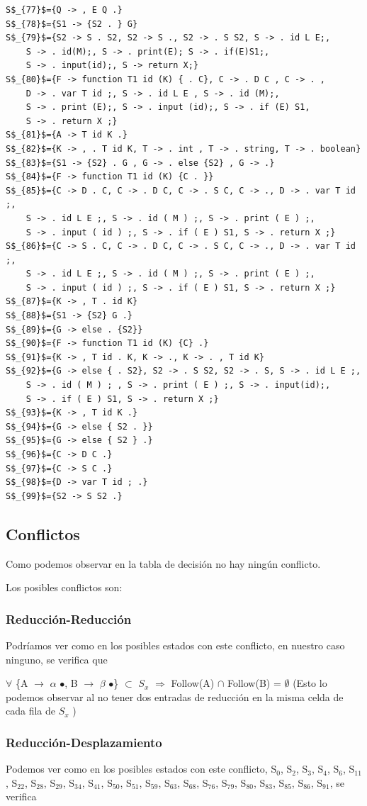 \begin{lstlisting}[style =EstadosAutomataST]
S$_{77}$={Q -> , E Q .}
S$_{78}$={S1 -> {S2 . } G}
S$_{79}$={S2 -> S . S2, S2 -> S ., S2 -> . S S2, S -> . id L E;,
	S -> . id(M);, S -> . print(E); S -> . if(E)S1;,
	S -> . input(id);, S -> return X;}
S$_{80}$={F -> function T1 id (K) { . C}, C -> . D C , C -> . ,
	D -> . var T id ;, S -> . id L E , S -> . id (M);,
	S -> . print (E);, S -> . input (id);, S -> . if (E) S1,
	S -> . return X ;}
S$_{81}$={A -> T id K .}
S$_{82}$={K -> , . T id K, T -> . int , T -> . string, T -> . boolean}
S$_{83}$={S1 -> {S2} . G , G -> . else {S2} , G -> .}
S$_{84}$={F -> function T1 id (K) {C . }}
S$_{85}$={C -> D . C, C -> . D C, C -> . S C, C -> ., D -> . var T id ;,
	S -> . id L E ;, S -> . id ( M ) ;, S -> . print ( E ) ;,
	S -> . input ( id ) ;, S -> . if ( E ) S1, S -> . return X ;}
S$_{86}$={C -> S . C, C -> . D C, C -> . S C, C -> ., D -> . var T id ;,
	S -> . id L E ;, S -> . id ( M ) ;, S -> . print ( E ) ;,
	S -> . input ( id ) ;, S -> . if ( E ) S1, S -> . return X ;}
S$_{87}$={K -> , T . id K}
S$_{88}$={S1 -> {S2} G .}
S$_{89}$={G -> else . {S2}}
S$_{90}$={F -> function T1 id (K) {C} .}
S$_{91}$={K -> , T id . K, K -> ., K -> . , T id K}
S$_{92}$={G -> else { . S2}, S2 -> . S S2, S2 -> . S, S -> . id L E ;,
	S -> . id ( M ) ; , S -> . print ( E ) ;, S -> . input(id);,
	S -> . if ( E ) S1, S -> . return X ;}
S$_{93}$={K -> , T id K .}  
S$_{94}$={G -> else { S2 . }}
S$_{95}$={G -> else { S2 } .}
S$_{96}$={C -> D C .}
S$_{97}$={C -> S C .}
S$_{98}$={D -> var T id ; .}
S$_{99}$={S2 -> S S2 .}
\end{lstlisting}

\subsection{Conflictos}
Como podemos observar en la tabla de decisión no hay ningún conflicto.

Los posibles conflictos son:
	\subsubsection*{Reducción-Reducción}
	Podríamos ver como en los posibles estados con este conflicto, en nuestro caso ninguno, se verifica que 
	
	$\forall$ \{A $\rightarrow$ $\alpha$ $\bullet$, B $\rightarrow$ $\beta$ $\bullet$\} $\subset$ $S_x$ $\Rightarrow$ Follow(A) $\cap$ Follow(B) = $\emptyset$ (Esto lo podemos observar al no tener dos entradas de reducción en la misma celda de cada fila de $S_x$ )
	
	\subsubsection*{Reducción-Desplazamiento}
	Podemos ver como en los posibles estados con este conflicto, S$_0$, S$_2$, S$_3$, S$_4$, S$_6$, S$_{11}$, S$_{22}$, S$_{28}$, S$_{29}$, S$_{34}$, S$_{41}$, S$_{50}$, S$_{51}$, S$_{59}$, S$_{63}$, S$_{68}$, S$_{76}$, S$_{79}$, S$_{80}$, S$_{83}$, S$_{85}$, S$_{86}$, S$_{91}$, se verifica
	
